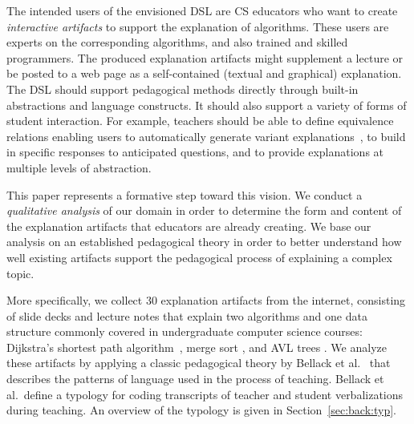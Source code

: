 \documentclass[conference]{IEEEtran}
\begin{document}
The intended users of the envisioned DSL are CS educators who want to create
\emph{interactive artifacts} to support the explanation of algorithms. These
users are experts on the corresponding algorithms, and also trained and skilled
programmers. The produced explanation artifacts might supplement a lecture or
be posted to a web page as a self-contained (textual and graphical)
explanation.
%
The DSL should support pedagogical methods directly through built-in
abstractions and language constructs. It should also support a variety of forms
of student interaction. For example, teachers should be able to define
equivalence relations enabling users to automatically generate variant
explanations~\cite{EW13jvlc}, to build in specific responses to anticipated
questions, and to provide explanations at multiple levels of abstraction.


This paper represents a formative step toward this vision. We conduct a
\emph{qualitative analysis} of our domain in order to determine the form and
content of the explanation artifacts that educators are already creating.
%
We base our analysis on an established pedagogical theory in order to better
understand how well existing artifacts support the pedagogical process of
explaining a complex topic.


More specifically, we collect 30 explanation artifacts from the internet,
consisting of slide decks and lecture notes that explain two algorithms and one
data structure commonly covered in undergraduate computer science courses:
Dijkstra's shortest path algorithm~\cite[pp.~137--142]{KT05}, merge sort
\cite[210--214]{KT05}, and AVL trees \cite[?]{?}.
%
We analyze these artifacts by applying a classic pedagogical theory by Bellack
et al.~\cite{bellack1966language} that describes the patterns of language used
in the process of teaching. Bellack et al.\ define a typology for coding
transcripts of teacher and student verbalizations during teaching. An overview
of the typology is given in Section~\ref{sec:back:typ}.
\end{document}
